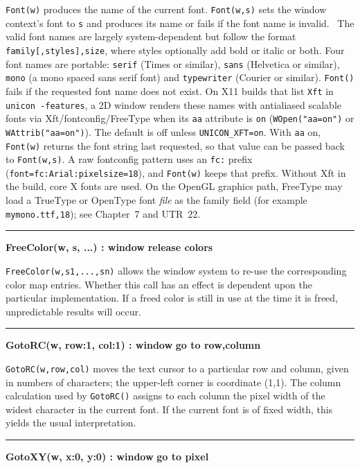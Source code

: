 \noindent
\texttt{Font(w)} produces the name of the current font.
\texttt{Font(w,s)} sets the window context's font to
\texttt{s} and produces its name or fails if the font name is invalid.
\ The valid font names are largely system-dependent but follow the
format \texttt{family[,styles],size}, where styles optionally add bold
or italic or both. Four font names are portable: \texttt{serif} (Times
or similar), \texttt{sans} (Helvetica or similar), \texttt{mono} (a
mono spaced sans serif font) and \texttt{typewriter} (Courier or
similar). \texttt{Font()} fails if the requested font name does not
exist.
On X11 builds that list \texttt{Xft} in \texttt{unicon -features},
a 2D window renders these names with antialiased scalable fonts via
Xft/fontconfig/FreeType when its \texttt{aa} attribute is \texttt{on}
(\texttt{WOpen("aa=on")} or \texttt{WAttrib("aa=on")}). The default
is off unless \texttt{UNICON\_XFT=on}. With \texttt{aa} on,
\texttt{Font(w)} returns the font string last requested, so that value
can be passed back to \texttt{Font(w,s)}. A raw fontconfig pattern
uses an \texttt{fc:} prefix
(\texttt{font=fc:Arial:pixelsize=18}), and \texttt{Font(w)} keeps
that prefix. Without Xft in the build, core X fonts are used.
On the OpenGL graphics path, FreeType may load a TrueType or OpenType
font \emph{file} as the family field (for example
\texttt{mymono.ttf,18}); see Chapter~7 and UTR~22.

\bigskip\hrule\vspace{0.1cm}
\noindent
{\bf FreeColor(w, s, ...) : window } \hfill {\bf release colors}

\noindent
\texttt{FreeColor(w,s1,...,sn)} allows the window system to re-use the
corresponding color map entries. Whether this call has an effect is
dependent upon the particular implementation. If a freed color is
still in use at the time it is freed, unpredictable results will occur.

\bigskip\hrule\vspace{0.1cm}
\noindent
{\bf GotoRC(w, row:1, col:1) : window } \hfill {\bf go to row,column}

\noindent
\texttt{GotoRC(w,row,col)} moves the text cursor to a particular row and
column, given in numbers of characters; the upper-left corner is
coordinate (1,1). The column calculation used by \texttt{GotoRC()}
assigns to each column the pixel width of the widest character in the
current font. If the current font is of fixed width, this yields the
usual interpretation.

\bigskip\hrule\vspace{0.1cm}
\noindent
{\bf GotoXY(w, x:0, y:0) : window } \hfill {\bf go to pixel}

